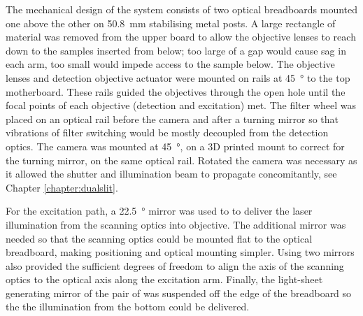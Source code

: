 The mechanical design of the system consists of two optical breadboards mounted one above the other on \SI{50.8}{\milli\metre} stabilising metal posts.
A large rectangle of material was removed from the upper board to allow the objective lenses to reach down to the samples inserted from below; too large of a gap would cause sag in each arm, too small would impede access to the sample below.
The objective lenses and detection objective actuator were mounted on rails at \SI{45}{\degree} to the top motherboard.
These rails guided the objectives through the open hole until the focal points of each objective (detection and excitation) met.
The filter wheel was placed on an optical rail before the camera and after a turning mirror so that vibrations of filter switching would be mostly decoupled from the detection optics.
The camera was mounted at \SI{45}{\degree}, on a 3D printed mount to correct for the turning mirror, on the same optical rail.
Rotated the camera was necessary as it allowed the shutter and illumination beam to propagate concomitantly, see Chapter \ref{chapter:dualslit}.

For the excitation path, a \SI{22.5}{\degree} mirror was used to to deliver the laser illumination from the scanning optics into objective.
The additional mirror was needed so that the scanning optics could be mounted flat to the optical breadboard, making positioning and optical mounting simpler.
Using two mirrors also provided the sufficient degrees of freedom to align the axis of the scanning optics to the optical axis along the excitation arm.
Finally, the light-sheet generating mirror of the pair of was suspended off the edge of the breadboard so the the illumination from the bottom could be delivered.





